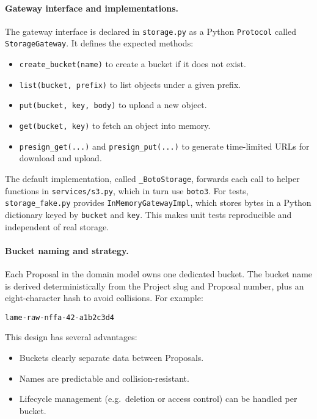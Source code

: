 \paragraph{Gateway interface and implementations.}
The gateway interface is declared in \texttt{storage.py} as a Python \texttt{Protocol} called \texttt{StorageGateway}.  
It defines the expected methods:  
\begin{itemize}
	\item \texttt{create\_bucket(name)} to create a bucket if it does not exist.  
	\item \texttt{list(bucket, prefix)} to list objects under a given prefix.  
	\item \texttt{put(bucket, key, body)} to upload a new object.  
	\item \texttt{get(bucket, key)} to fetch an object into memory.  
	\item \texttt{presign\_get(...)} and \texttt{presign\_put(...)} to generate time-limited URLs for download and upload.  
\end{itemize}

The default implementation, called \texttt{\_BotoStorage}, forwards each call to helper functions in \texttt{services/s3.py}, which in turn use \texttt{boto3}.  
For tests, \texttt{storage\_fake.py} provides \texttt{InMemoryGatewayImpl}, which stores bytes in a Python dictionary keyed by \texttt{bucket} and \texttt{key}. 
This makes unit tests reproducible and independent of real storage.

\paragraph{Bucket naming and strategy.}
Each Proposal in the domain model owns one dedicated bucket.  
The bucket name is derived deterministically from the Project slug and Proposal number, 
plus an eight-character hash to avoid collisions.  
For example:  
\begin{center}
	\texttt{lame-raw-nffa-42-a1b2c3d4}
\end{center}

This design has several advantages:  
\begin{itemize}
	\item Buckets clearly separate data between Proposals.  
	\item Names are predictable and collision-resistant.  
	\item Lifecycle management (e.g.\ deletion or access control) can be handled per bucket.  
\end{itemize}

